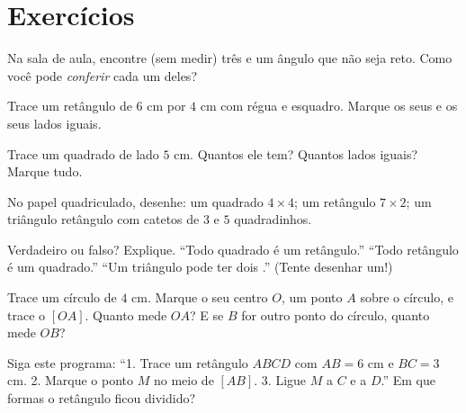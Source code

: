 \section{Exercícios}

\begin{exercise}[$\star$]\label{exo:g3:shapes:1}
Na sala de aula, encontre (sem medir) três  e um ângulo
que não seja reto. Como você pode \emph{conferir} cada um deles?
\end{exercise}

\begin{exercise}[$\star$]\label{exo:g3:shapes:2}
Trace um retângulo de $6$ cm por $4$ cm com régua e esquadro. Marque
os seus  e os seus lados iguais.
\end{exercise}

\begin{exercise}[$\star$]\label{exo:g3:shapes:3}
Trace um quadrado de lado $5$ cm. Quantos  ele tem?
Quantos lados iguais? Marque tudo.
\end{exercise}

\begin{exercise}[$\star$]\label{exo:g3:shapes:4}
No papel quadriculado, desenhe: um quadrado $4 \times 4$; um
retângulo $7 \times 2$; um triângulo retângulo com catetos de $3$ e
$5$ quadradinhos.
\end{exercise}

\begin{exercise}[$\star$]\label{exo:g3:shapes:5}
Verdadeiro ou falso? Explique.
``Todo quadrado é um retângulo.'' \quad
``Todo retângulo é um quadrado.'' \quad
``Um triângulo pode ter dois .'' (Tente desenhar um!)
\end{exercise}

\begin{exercise}[$\star$]\label{exo:g3:shapes:6}
Trace um círculo de  $4$ cm. Marque o seu centro $O$, um ponto
$A$ sobre o círculo, e trace o  $[OA]$. Quanto mede $OA$? E se
$B$ for outro ponto do círculo, quanto mede $OB$?
\end{exercise}

\begin{exercise}[$\star$]\label{exo:g3:shapes:7}
Siga este programa: ``1. Trace um retângulo $ABCD$ com $AB = 6$ cm e
$BC = 3$ cm. 2. Marque o ponto $M$ no meio de $[AB]$. 3. Ligue $M$ a
$C$ e a $D$.'' Em que formas o retângulo ficou dividido?
\end{exercise}

